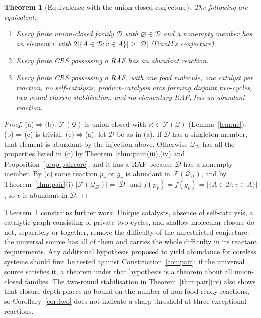 \documentclass[11pt,a4paper]{article}
\theoremstyle{plain}
\newtheorem{theorem}{Theorem}[section]
\theoremstyle{definition}
\theoremstyle{remark}
\newcommand{\FF}{\mathcal F}
\newcommand{\DD}{\mathcal D}
\newcommand{\QQ}{\mathcal Q}
\begin{document}
\begin{theorem}[Equivalence with the union-closed conjecture]\label{thm:equiv}
The following are equivalent.
\begin{enumerate}[label=(\alph*)]
\item Every finite union-closed family $\DD$ with $\varnothing\in\DD$ and a nonempty member has
an element $v$ with $2|\{A\in\DD:v\in A\}|\ge|\DD|$ (Frankl's conjecture).
\item Every finite CRS possessing a RAF has an abundant reaction.
\item Every finite CRS possessing a RAF, with one food molecule, one catalyst per reaction, no
self-catalysis, product--catalysis arcs forming disjoint two-cycles, two-round closure
stabilisation, and no elementary RAF, has an abundant reaction.
\end{enumerate}
\end{theorem}
\begin{proof}
(a)$\Rightarrow$(b): $\FF(\QQ)$ is union-closed with $\varnothing\in\FF(\QQ)$ (Lemma~\ref{lem:uc}).
(b)$\Rightarrow$(c) is trivial. (c)$\Rightarrow$(a): let $\DD$ be as in (a). If $\DD$ has a
singleton member, that element is abundant by the injection above. Otherwise $\QQ_\DD$ has
all the properties listed in (c) by Theorem~\ref{thm:pair}(iii),(iv) and
Proposition~\ref{prop:paircore}, and it has a RAF because $\DD$ has a nonempty member.
By (c) some reaction $p_v$ or $g_v$ is abundant in $\FF(\QQ_\DD)$, and by
Theorem~\ref{thm:pair}(i) $|\FF(\QQ_\DD)|=|\DD|$ and $f(p_v)=f(g_v)=|\{A\in\DD:v\in A\}|$, so
$v$ is abundant in $\DD$.
\end{proof}

Theorem~\ref{thm:equiv} constrains further work. Unique catalysts, absence of
self-catalysis, a catalytic graph consisting of private two-cycles, and shallow molecular
closure do not, separately or together, remove the difficulty of the unrestricted
conjecture: the universal source has all of them and carries the whole difficulty in its
reactant requirements. Any additional hypothesis proposed to yield abundance for coreless
systems should first be tested against Construction~\ref{con:pair}; if the universal source
satisfies it, a theorem under that hypothesis is a theorem about all union-closed families.
The two-round stabilisation in Theorem~\ref{thm:pair}(iv) also shows that closure depth
places no bound on the number of non-food-ready reactions, so Corollary~\ref{cor:two} does
not indicate a sharp threshold at three exceptional reactions.
\end{document}
